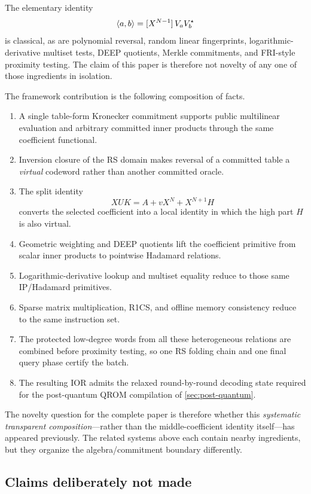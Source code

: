The elementary identity
\[
  \left\langle a,b\right\rangle=[X^{N-1}]\,V_aV_b^\star
\]
is classical, as are polynomial reversal, random linear fingerprints, logarithmic-derivative multiset tests, DEEP quotients, Merkle commitments, and FRI-style proximity testing.  The claim of this paper is therefore not novelty of any one of those ingredients in isolation.

The framework contribution is the following composition of facts.
\begin{enumerate}[label=(\arabic*),leftmargin=*]
  \item A single table-form Kronecker commitment supports public multilinear evaluation and arbitrary committed inner products through the same coefficient functional.
  \item Inversion closure of the RS domain makes reversal of a committed table a \emph{virtual} codeword rather than another committed oracle.
  \item The split identity
  \[
    XUK=A+vX^N+X^{N+1}H
  \]
  converts the selected coefficient into a local identity in which the high part $H$ is also virtual.
  \item Geometric weighting and DEEP quotients lift the coefficient primitive from scalar inner products to pointwise Hadamard relations.
  \item Logarithmic-derivative lookup and multiset equality reduce to those same IP/Hadamard primitives.
  \item Sparse matrix multiplication, R1CS, and offline memory consistency reduce to the same instruction set.
  \item The protected low-degree words from all these heterogeneous relations are combined before proximity testing, so one RS folding chain and one final query phase certify the batch.
  \item The resulting IOR admits the relaxed round-by-round decoding state required for the post-quantum QROM compilation of \cref{sec:post-quantum}.
\end{enumerate}
The novelty question for the complete paper is therefore whether this \emph{systematic transparent composition}---rather than the middle-coefficient identity itself---has appeared previously.  The related systems above each contain nearby ingredients, but they organize the algebra/commitment boundary differently.

\subsection{Claims deliberately not made}
\label{sec:comparison-no-claims}

